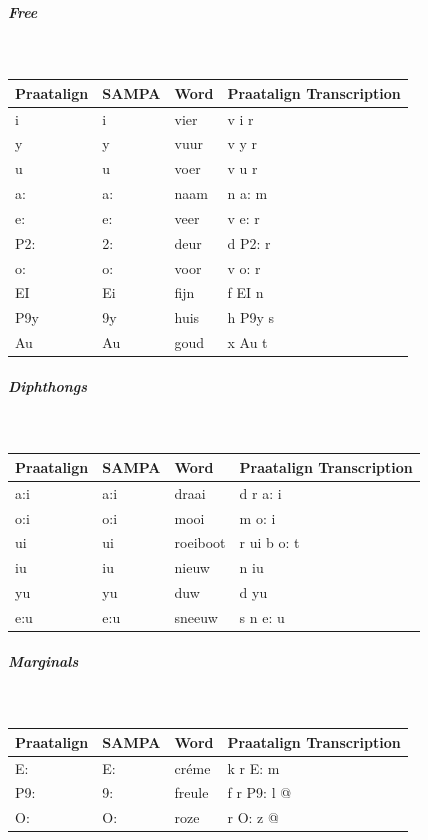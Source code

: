 \documentclass[twoside,a4paper]{book}
\begin{document}
\subparagraph{Free}\strut\\
\begin{tabular}{llll}
	Praatalign & SAMPA & Word & Praatalign Transcription\\
	\hline
	i & i & vier & v i r\\
	y & y & vuur & v y r\\
	u & u & voer & v u r\\
	a: & a: & naam & n a: m\\
	e: & e: & veer & v e: r\\
	P2: & 2: & deur & d P2: r\\
	o: & o: & voor & v o: r\\
	EI & Ei & fijn & f EI n\\
	P9y & 9y & huis & h P9y s\\
	Au & Au & goud & x Au t
\end{tabular}

\subparagraph{Diphthongs}\strut\\
\begin{tabular}{llll}
	Praatalign & SAMPA & Word & Praatalign Transcription\\
	\hline
	a:i & a:i & draai & d r a: i\\
	o:i & o:i & mooi & m o: i\\
	ui & ui & roeiboot & r ui b o: t\\
	iu & iu & nieuw & n iu\\
	yu & yu & duw & d yu\\
	e:u & e:u & sneeuw & s n e: u
\end{tabular}

\subparagraph{Marginals}\strut\\
\begin{tabular}{llll}
	Praatalign & SAMPA & Word & Praatalign Transcription\\
	\hline
	E: & E: & cr\'eme & k r E: m\\
	P9: & 9: & freule & f r P9: l @\\
	O: & O: & roze & r O: z @
\end{tabular}

\newpage
\end{document}
